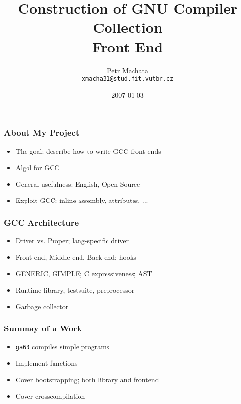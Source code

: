 \documentclass{beamer}
\title[Construction of GNU Compiler Collection Front End]{Construction of GNU Compiler Collection\\Front End}
\author[Petr Machata]{Petr Machata \\ \texttt{xmacha31@stud.fit.vutbr.cz}}
\date{2007-01-03}
\def\Algol{{\sc Algol}\space}
\begin{document}
\frame{\titlepage}

\frame
{
  \frametitle{About My Project}

  \begin{itemize}
  \item The goal: describe how to write GCC front ends
  \item \Algol 60 for GCC
  \item General usefulness: English, Open Source
  \item Exploit GCC: inline assembly, attributes, ...
  \end{itemize}
}

\frame
{
  \frametitle{GCC Architecture}

  \begin{itemize}
  \item Driver vs. Proper; lang-specific driver
  \item Front end, Middle end, Back end; hooks
  \item GENERIC, GIMPLE; C expressiveness; AST
  \item Runtime library, testsuite, preprocessor
  \item Garbage collector
  \end{itemize}
}

\frame
{
  \frametitle{Summay of a Work}

  \begin{itemize}
  \item {\tt ga60} compiles simple programs
  \item Implement functions
  \item Cover bootstrapping; both library and frontend
  \item Cover crosscompilation
  \end{itemize}
}
\end{document}

